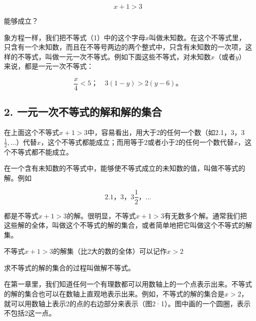 \[
x + 1 > 3 \tag{1}
\]

能够成立？

象方程一样，我们把不等式（1）中的这个字母\(x\)叫做未知数。在这个不等式里，只含有一个未知数，而且在不等号两边的两个整式中，只含有未知数的一次项，这样的不等式，叫做一元一次不等式。例如下面这些不等式，对未知数\(x\)（或者\(y\)）来说，都是一元一次不等式：

\[
\frac{x}{4} <   5\text{；} \quad 3 (1 - y) > 2 (y - 6)\text{。}
\]

\subsection{2. 一元一次不等式的解和解的集合}

在上面这个不等式\(x + 1 > 3\)中，容易看出，用大于2的任何一个数（如2.1，3，3\(\frac{1}{2},\dots\)）代替\(x\)，这个不等式都能成立；而用等于2或者小于2的任何一个数代替\(x\)，这个不等式都不能成立。

在一个含有未知数的不等式中，能够使不等式成立的未知数的值，叫做不等式的解。例如

\[
2.1\text{，} 3\text{，} 3 \frac{1}{2}\text{，} \dots
\]

都是不等式\(x + 1 > 3\)的解。很明显，不等式\(x + 1 > 3\)有无数多个解。通常我们把这些解的全体，叫做这个不等式的解的集合，或者简单地把它叫做这个不等式的解集。

不等式\(x + 1 > 3\)的解集（比2大的数的全体）可以记作\(x > 2\)

求不等式的解的集合的过程叫做解不等式。

在第一章里，我们知道任何一个有理数都可以用数轴上的一个点表示出来。不等式的解的集合也可以在数轴上直观地表示出来。例如，不等式的解的集合是\(x > 2\)，就可以用数轴上表示2的点的右边部分来表示（图2·1）。图中画的一个圆圈，表示不包括2这一点。

